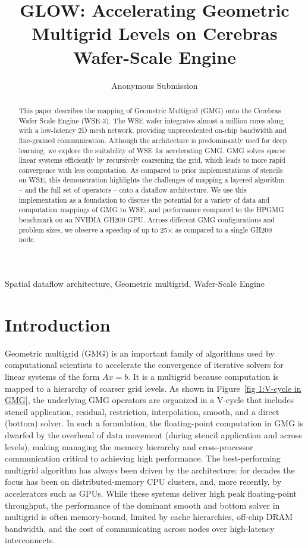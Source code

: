 \documentclass[conference]{IEEEtran}
\begin{document}
    \title{GLOW: Accelerating Geometric Multigrid Levels on Cerebras Wafer-Scale Engine}
    \author{Anonymous Submission}
    \maketitle
    \begin{abstract}
        This paper describes the mapping of Geometric Multigrid (GMG) onto the Cerebras Wafer Scale Engine (WSE-3).  The WSE wafer integrates almost a million cores along with a low-latency 2D mesh network, providing unprecedented on-chip bandwidth and fine-grained communication. Although the architecture is predominantly used for deep learning, we explore the suitability of WSE for accelerating GMG.
        GMG solves sparse linear systems efficiently by recursively coarsening the grid, which leads to more rapid convergence with less computation.
        As compared to prior implementations of stencils on WSE, this demonstration highlights the challenges of mapping a layered algorithm -- and the full set of operators -- onto a dataflow architecture.  We use this implementation as a foundation to discuss the potential for a variety of data and computation mappings of GMG to WSE, and performance compared to the HPGMG benchmark on an NVIDIA GH200 GPU.  Across different GMG configurations and problem sizes, we observe a speedup of up to 25\(\times\) as compared to a single GH200 node.
    \end{abstract}
    \begin{IEEEkeywords}
        Spatial dataflow architecture, Geometric multigrid, Wafer-Scale Engine
    \end{IEEEkeywords}
    \section{Introduction}
        Geometric multigrid (GMG) is an important family of algorithms used by computational scientists to accelerate the convergence of iterative solvers for linear systems of the form \(Ax=b\). It is a multigrid because computation is mapped to a hierarchy of coarser grid levels.  As shown in Figure~\ref{fig 1:V-cycle in GMG}, the underlying GMG operators are organized in a V-cycle that includes stencil application, residual, restriction, interpolation, smooth, and a direct (bottom) solver. In such a formulation, the floating-point computation in GMG is dwarfed by the overhead of data movement (during stencil application and across levels), making managing the memory hierarchy and cross-processor communication critical to achieving high performance. The best-performing multigrid algorithm has always been driven by the architecture: for decades the focus has been on distributed-memory CPU clusters, and, more recently, by accelerators such as GPUs. While these systems deliver high peak floating-point throughput, the performance of the dominant smooth and bottom solver in multigrid is often memory-bound, limited by cache hierarchies, off-chip DRAM bandwidth, and the cost of communicating across nodes over high-latency interconnects. 
\end{document}
